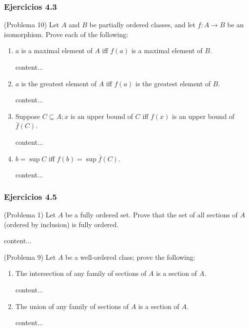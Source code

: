 \subsubsection{Ejercicios 4.3}
\begin{problema}(Problema 10)
	Let $A$ and $B$ be partially ordered classes, and let $f: A \rightarrow B$ be an isomorphism. Prove each of the following:
	\begin{enumerate}
		\item  $a$ is a maximal element of $A$ iff $f(a)$ is a maximal element of $B$.
		\begin{dem}
			content...
		\end{dem}
		\item $a$ is the greatest element of $A$ iff $f(a)$ is the greatest element of $B$.
		\begin{dem}
			content...
		\end{dem}
		\item Suppose $C \subseteq A ; x$ is an upper bound of $C$ iff $f(x)$ is an upper bound of $\bar{f}(C)$.
		\begin{dem}
			content...
		\end{dem}
		\item $b=\sup C$ iff $f(b)=\sup \bar{f}(C)$.
		\begin{dem}
			content...
		\end{dem}
	\end{enumerate}
	
\end{problema}
\subsubsection{Ejercicios 4.5}
\begin{problema}(Problema 1)
	Let $A$ be a fully ordered set. Prove that the set of all sections of $A$ (ordered by inclusion) is fully ordered.
	\begin{dem}
		content...
	\end{dem}
\end{problema}
\begin{problema}(Problema 9)
	Let $A$ be a well-ordered class; prove the following:
	\begin{enumerate}
		\item The intersection of any family of sections of $A$ is a section of $A$.
		\begin{dem}
			content...
		\end{dem}
		\item The union of any family of sections of $A$ is a section of $A$.
		\begin{dem}
			content...
		\end{dem}
	\end{enumerate}
	
\end{problema}
